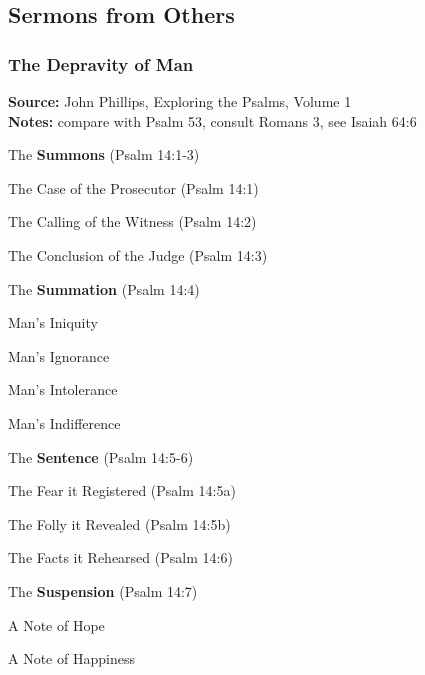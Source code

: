 \subsection{Sermons from Others}

\subsubsection{The Depravity of Man}
\textbf{Source:} John Phillips, Exploring the Psalms, Volume 1\\
\textbf{Notes:} compare with Psalm 53, consult Romans 3, see Isaiah 64:6
\begin{compactenum}[I.][9]
    \item The \textbf{Summons} (Psalm 14:1-3)
	\begin{compactenum}[A.]
		\item The Case of the Prosecutor  (Psalm 14:1)
		\item The Calling of the Witness  (Psalm 14:2)
		\item The Conclusion of the Judge  (Psalm 14:3)
	\end{compactenum}
    \item The \textbf{Summation} (Psalm 14:4)
	\begin{compactenum}[A.]
		\item Man's Iniquity
		\item Man's Ignorance
		\item Man's Intolerance
		\item Man's Indifference
	\end{compactenum}
    \item The \textbf{Sentence} (Psalm 14:5-6)
	\begin{compactenum}[A.]
		\item The Fear it Registered  (Psalm 14:5a)
		\item The Folly it Revealed  (Psalm 14:5b)
		\item The Facts it Rehearsed   (Psalm 14:6)
	\end{compactenum}
    \item The \textbf{Suspension} (Psalm 14:7)
	\begin{compactenum}[A.]
		\item A Note of Hope
		\item A Note of Happiness
	\end{compactenum}
\end{compactenum}

